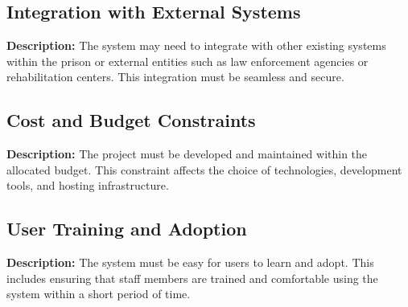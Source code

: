 \subsection*{Integration with External Systems}
\textbf{Description:} The system may need to integrate with other existing systems within the prison or external entities such as law enforcement agencies or rehabilitation centers. This integration must be seamless and secure.

\subsection*{Cost and Budget Constraints}
\textbf{Description:} The project must be developed and maintained within the allocated budget. This constraint affects the choice of technologies, development tools, and hosting infrastructure.

\subsection*{User Training and Adoption}
\textbf{Description:} The system must be easy for users to learn and adopt. This includes ensuring that staff members are trained and comfortable using the system within a short period of time.
